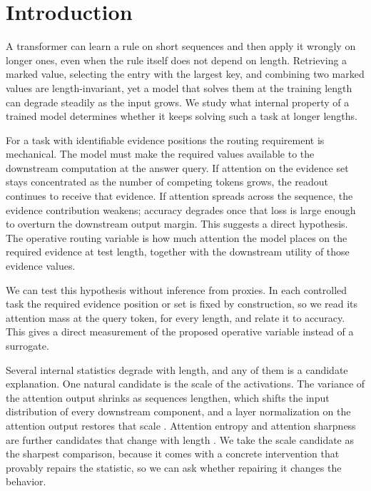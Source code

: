 \documentclass[letterpaper]{article} %
\begin{document}
\section{Introduction}

A transformer can learn a rule on short sequences and then apply it wrongly on longer ones, even when the
rule itself does not depend on length.
Retrieving a marked value, selecting the entry with the largest key, and combining two marked values are
length-invariant, yet a model that solves them at the training length can degrade steadily as the input
grows.
We study what internal property of a trained model determines whether it keeps solving such a task at
longer lengths.

For a task with identifiable evidence positions the routing requirement is mechanical.
The model must make the required values available to the downstream computation at the answer query.
If attention on the evidence set stays concentrated as the number of competing tokens grows, the readout
continues to receive that evidence.
If attention spreads across the sequence, the evidence contribution weakens; accuracy degrades once that
loss is large enough to overturn the downstream output margin.
This suggests a direct hypothesis.
The operative routing variable is how much attention the model places on the required evidence at test
length, together with the downstream utility of those evidence values.

We can test this hypothesis without inference from proxies.
In each controlled task the required evidence position or set is fixed by construction, so we read its
attention mass at the query token, for every length, and relate it to accuracy.
This gives a direct measurement of the proposed operative variable instead of a surrogate.

Several internal statistics degrade with length, and any of them is a candidate explanation.
One natural candidate is the scale of the activations.
The variance of the attention output shrinks as sequences lengthen, which shifts the input distribution of
every downstream component, and a layer normalization on the attention output restores that scale
\citep{vanishingvariance}.
Attention entropy and attention sharpness are further candidates that change with length
\citep{nopeentropy,ssmax,sparselong}.
We take the scale candidate as the sharpest comparison, because it comes with a concrete intervention that
provably repairs the statistic, so we can ask whether repairing it changes the behavior.
\end{document}
